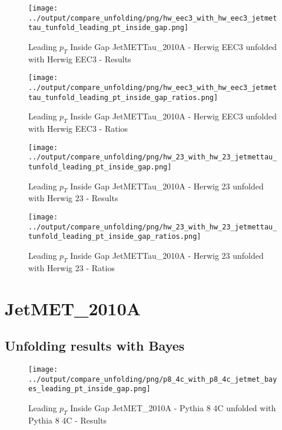 \documentclass[11pt]{book}
\begin{document}
\begin{figure}[ht]
\centering
\texttt{[image: ../output/compare\_unfolding/png/hw\_eec3\_with\_hw\_eec3\_jetmettau\_tunfold\_leading\_pt\_inside\_gap.png]}
\caption{Leading $p_{T}$ Inside Gap JetMETTau\_2010A - Herwig EEC3 unfolded with Herwig EEC3 - Results}
\label{hw_eec3_hw_eec3_jetmettau_tunfold_leading_pt_inside_gap_a}
\end{figure}

\begin{figure}[ht]
\centering
\texttt{[image: ../output/compare\_unfolding/png/hw\_eec3\_with\_hw\_eec3\_jetmettau\_tunfold\_leading\_pt\_inside\_gap\_ratios.png]}
\caption{Leading $p_{T}$ Inside Gap JetMETTau\_2010A - Herwig EEC3 unfolded with Herwig EEC3 - Ratios}
\label{hw_eec3_hw_eec3_jetmettau_tunfold_leading_pt_inside_gap_b}
\end{figure}

\begin{figure}[ht]
\centering
\texttt{[image: ../output/compare\_unfolding/png/hw\_23\_with\_hw\_23\_jetmettau\_tunfold\_leading\_pt\_inside\_gap.png]}
\caption{Leading $p_{T}$ Inside Gap JetMETTau\_2010A - Herwig 23 unfolded with Herwig 23 - Results}
\label{hw_23_hw_23_jetmettau_tunfold_leading_pt_inside_gap_a}
\end{figure}

\begin{figure}[ht]
\centering
\texttt{[image: ../output/compare\_unfolding/png/hw\_23\_with\_hw\_23\_jetmettau\_tunfold\_leading\_pt\_inside\_gap\_ratios.png]}
\caption{Leading $p_{T}$ Inside Gap JetMETTau\_2010A - Herwig 23 unfolded with Herwig 23 - Ratios}
\label{hw_23_hw_23_jetmettau_tunfold_leading_pt_inside_gap_b}
\end{figure}


\clearpage
\section{JetMET\_2010A}
\subsection{Unfolding results with Bayes}

\begin{figure}[ht]
\centering
\texttt{[image: ../output/compare\_unfolding/png/p8\_4c\_with\_p8\_4c\_jetmet\_bayes\_leading\_pt\_inside\_gap.png]}
\caption{Leading $p_{T}$ Inside Gap JetMET\_2010A - Pythia 8 4C unfolded with Pythia 8 4C - Results}
\label{p8_p8_jetmet_bayes_leading_pt_inside_gap_a}
\end{figure}
\end{document}
